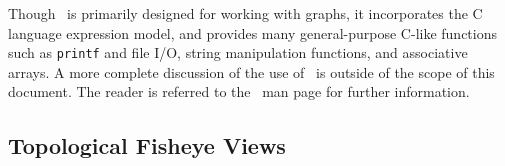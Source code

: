 Though \gvpr\ is primarily designed for working with graphs, it incorporates the C language
expression model, and provides many general-purpose C-like functions such as {\tt printf} and file I/O,
string manipulation functions, and associative arrays. A more complete discussion of the use of
\gvpr\ is outside of the scope of this document. The reader is referred to the \gvpr\ man page for
further information. 

\subsection{Topological Fisheye Views}
\label{sec:topfish}
